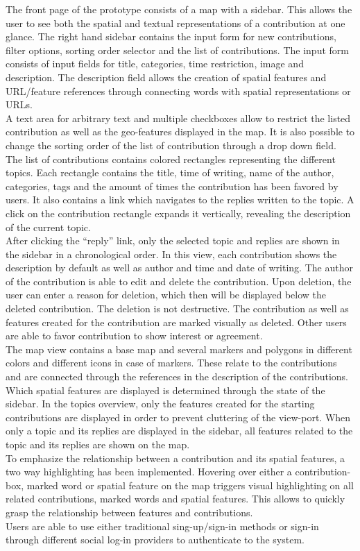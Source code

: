 The front page of the prototype consists of a map with a sidebar. This allows the user to see both the spatial and textual representations of a contribution at one glance. The right hand sidebar contains the input form for new contributions, filter options, sorting order selector and the list of contributions. The input form consists of input fields for title, categories, time restriction, image and description. The description field allows the creation of spatial features and URL/feature references through connecting words with spatial representations or URLs.\\
A text area for arbitrary text and multiple checkboxes allow to restrict the listed contribution as well as the geo-features displayed in the map. It is also possible to change the sorting order of the list of contribution through a drop down field.\\
The list of contributions contains colored rectangles representing the different topics. Each rectangle contains the title, time of writing, name of the author, categories, tags and the amount of times the contribution has been favored by users. It also contains a link which navigates to the replies written to the topic. A click on the contribution rectangle expands it vertically, revealing the description of the current topic.\\
After clicking the ``reply'' link, only the selected topic and replies are shown in the sidebar in a chronological order. In this view, each contribution shows the description by default as well as author and time and date of writing. The author of the contribution is able to edit and delete the contribution. Upon deletion, the user can enter a reason for deletion, which then will be displayed below the deleted contribution. The deletion is not destructive. The contribution as well as features created for the contribution are marked visually as deleted. Other users are able to favor contribution to show interest or agreement.\\
The map view contains a base map and several markers and polygons in different colors and different icons in case of markers. These relate to the contributions and are connected through the references in the description of the contributions. Which spatial features are displayed is determined through the state of the sidebar. In the topics overview, only the features created for the starting contributions are displayed in order to prevent cluttering of the view-port. When only a topic and its replies are displayed in the sidebar, all features related to the topic and its replies are shown on the map.\\
To emphasize the relationship between a contribution and its spatial features, a two way highlighting has been implemented. Hovering over either a contribution-box, marked word or spatial feature on the map triggers visual highlighting on all related contributions, marked words and spatial features. This allows to quickly grasp the relationship between features and contributions.\\
Users are able to use either traditional sing-up/sign-in methods or sign-in through different social log-in providers to authenticate to the system.

